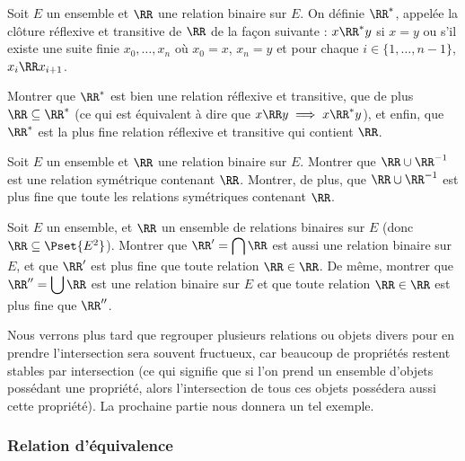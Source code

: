\begin{exo}
    Soit $E$ un ensemble et $\RR$ une relation binaire sur $E$. On définie $\RR^*$, appelée la clôture réflexive et transitive de $\RR$ de la façon suivante : 
    $x\RR^*y$ si $x=y$ ou s'il existe une suite finie $x_0,\ldots,x_n$ où $x_0=x$, $x_n=y$ et pour chaque $i\in\{1,\ldots, n-1\}$, $x_i\RR x_{i+1}$.
    
    Montrer que $\RR^*$ est bien une relation réflexive et transitive, que de plus $\RR\subseteq \RR^*$ (ce qui est équivalent à dire que $x\RR y \implies x\RR^* y$), et enfin, que $\RR^*$ est la plus fine relation réflexive et transitive qui contient $\RR$.
\end{exo}

\begin{exo}\label{exo:sym}
    Soit $E$ un ensemble et $\RR$ une relation binaire sur $E$. Montrer que $\RR\cup \RR^{-1}$ est une relation symétrique contenant $\RR$. Montrer, de plus, que $\RR\cup \RR^{-1}$ est plus fine que toute les relations symétriques contenant $\RR$.
\end{exo}

\begin{exo}
    Soit $E$ un ensemble, et $\boldsymbol{\RR}$ un ensemble de relations binaires sur $E$ (donc $\boldsymbol{\RR}\subseteq\Pset{E^2}$). Montrer que $\RR' = \displaystyle{\bigcap \boldsymbol{\RR}}$ est aussi une relation binaire sur $E$, et que $\RR'$ est plus fine que toute relation $\RR\in\boldsymbol{\RR}$. De même, montrer que $\RR'' = \displaystyle{\bigcup\boldsymbol{\RR}}$ est une relation binaire sur $E$ et que toute relation $\RR\in\boldsymbol{\RR}$ est plus fine que $\RR''$.
\end{exo}

Nous verrons plus tard que regrouper plusieurs relations ou objets divers pour en prendre l'intersection sera souvent fructueux, car beaucoup de propriétés restent stables par intersection (ce qui signifie que si l'on prend un ensemble d'objets possédant une propriété, alors l'intersection de tous ces objets possédera aussi cette propriété). La prochaine partie nous donnera un tel exemple.

\subsubsection{Relation d'équivalence}

